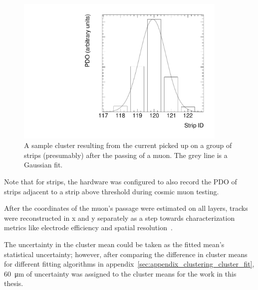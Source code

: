 \begin{figure}
    \centering
    \includegraphics[width = 0.9\textwidth]{figures/sample_cluster_QL2C04_event5_layer2.pdf}
    \caption{A sample cluster resulting from the current picked up on a group of strips (presumably) after the passing of a muon. The grey line is a Gaussian fit.}
    \label{fig:sample_cluster}
\end{figure}

Note that for strips, the hardware was configured to also record the PDO of strips adjacent to a strip above threshold during cosmic muon testing.

After the coordinates of the muon's passage were estimated on all layers, tracks were reconstructed in x and y separately as a step towards characterization metrics like electrode efficiency and spatial resolution~\cite{lefebvre_thesis}. 

The uncertainty in the cluster mean could be taken as the fitted mean's statistical uncertainty; however, after comparing the difference in cluster means for different fitting algorithms in appendix~\ref{sec:appendix_clustering_cluster_fit}, \SI{60}{\micro\meter} of uncertainty was assigned to the cluster means for the work in this thesis.
    
